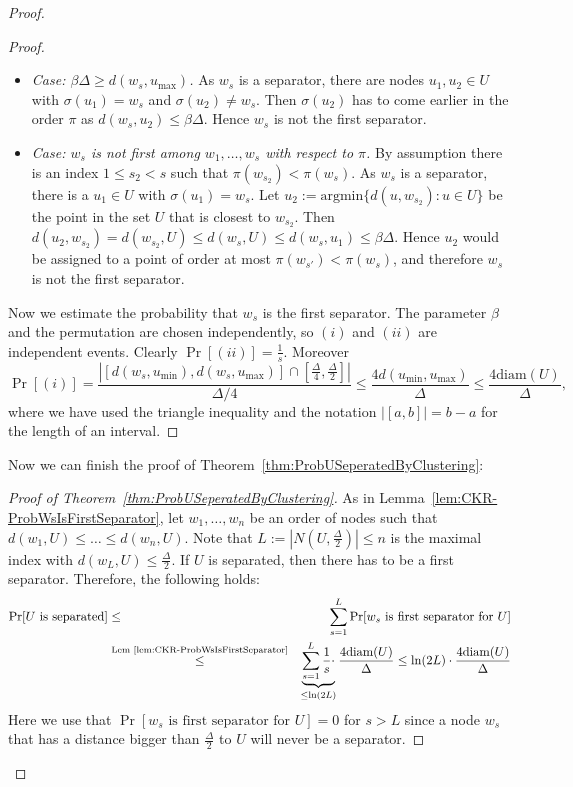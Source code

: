 \begin{proof}
\begin{proof}
\begin{itemize}
\item \emph{Case: $\beta \Delta \geq d(w_s,u_{\max})$.} As $w_s$ is a separator, there are nodes $u_1,u_2 \in U$
  with $\sigma(u_1) = w_s$ and $\sigma(u_2) \neq w_s$. Then $\sigma(u_2)$ has to come earlier in the order $\pi$ as $d(w_s,u_2) \leq \beta \Delta$. Hence $w_s$ is not the first separator.
\item \emph{Case: $w_s$ is not first among $w_1,\ldots,w_s$ with respect to $\pi$.} By assumption there
  is an index $1 \leq s_2 <s$ such that $\pi(w_{s_2}) < \pi(w_s)$. As $w_s$ is a separator, there
  is a $u_1 \in U$ with $\sigma(u_1) = w_s$.
  Let $u_2 := \textrm{argmin}\{ d(u,w_{s_2}) : u \in U\}$ be the point in the set $U$ that is closest to $w_{s_2}$.
  Then $d(u_2,w_{s_2}) = d(w_{s_2},U) \leq d(w_s,U) \leq d(w_s,u_1) \leq \beta \Delta$. 
  Hence $u_2$ would be assigned to a point of order at most $\pi(w_{s'}) < \pi(w_s)$, and therefore $w_s$ is not the first separator.
\end{itemize}
Now we estimate the probability that $w_s$ is the first separator.
 The parameter $\beta$ and the permutation are chosen independently, so $(i)$ and $(ii)$ are
independent events. Clearly $\Pr[(ii)] = \frac{1}{s}$. Moreover
\[
  \Pr[(i)] = \frac{|[d(w_s,u_{\min}),d(w_s,u_{\max})] \cap [\frac{\Delta}{4},\frac{\Delta}{2}]|}{\Delta/4}
  \leq \frac{4d(u_{\min},u_{\max})}{\Delta} \leq \frac{4\textrm{diam}(U)}{\Delta},
\]
where we have used the triangle inequality and the notation  $|[a,b]| = b-a$ for the length of an interval.
\end{proof}
Now we can finish the proof of Theorem~\ref{thm:ProbUSeperatedByClustering}:
\begin{proof}[Proof of Theorem~\ref{thm:ProbUSeperatedByClustering}]
  As in Lemma~\ref{lem:CKR-ProbWsIsFirstSeparator}, let $w_1,\ldots,w_n$ be an order of nodes such that $d(w_1,U) \leq \ldots \leq d(w_n,U)$.
  Note that $L := |N(U,\frac{\Delta}{2})| \leq n$ is the maximal index with $d(w_L,U) \leq \frac{\Delta}{2}$.
  If $U$ is separated, then there has to be a first separator.
Therefore, the following holds:
  \begin{eqnarray*}
    \Pr[U\textrm{ is separated}] &\leq& \sum_{s=1}^L \Pr[w_s\textrm{ is first separator for }U] \\
    &\stackrel{\textrm{Lem~\ref{lem:CKR-ProbWsIsFirstSeparator}}}{\leq}& \underbrace{\sum_{s=1}^L \frac{1}{s} \cdot}_{\leq \ln(2L)} \frac{4\textrm{diam}(U)}{\Delta} \leq \ln(2L) \cdot \frac{4\textrm{diam}(U)}{\Delta}
  \end{eqnarray*}
  Here we use that $\Pr[w_s\textrm{ is first separator for }U] = 0$ for $s>L$ since a node $w_s$ that has a distance bigger than $\frac{\Delta}{2}$ to $U$ will never be a separator.
\end{proof}
\end{proof}





